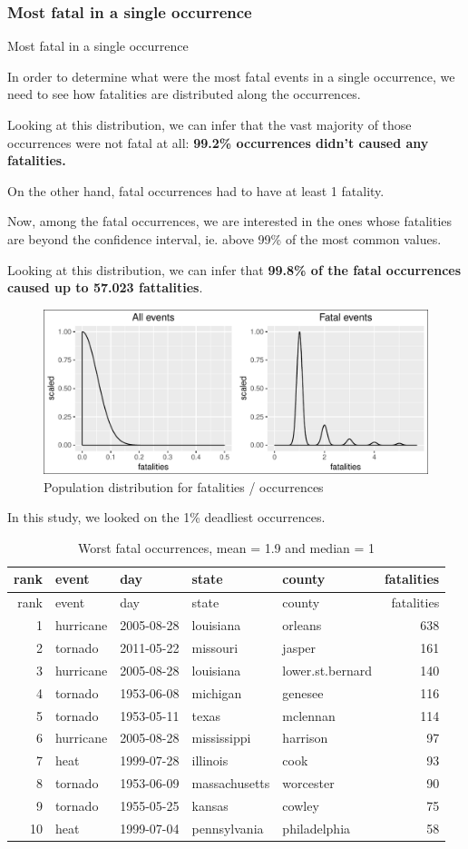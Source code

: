 \documentclass[]{article}
\begin{document}
\subsubsection{Most fatal in a single
occurrence}\label{most-fatal-in-a-single-occurrence}

Most fatal in a single occurrence

In order to determine what were the most fatal events in a single
occurrence, we need to see how fatalities are distributed along the
occurrences.

Looking at this distribution, we can infer that the vast majority of
those occurrences were not fatal at all: \textbf{99.2\% occurrences
didn't caused any fatalities.}

On the other hand, fatal occurrences had to have at least 1 fatality.

Now, among the fatal occurrences, we are interested in the ones whose
fatalities are beyond the confidence interval, ie. above 99\% of the
most common values.

Looking at this distribution, we can infer that \textbf{99.8\% of the
fatal occurrences caused up to 57.023 fattalities}.

\begin{figure}[htbp]
\centering
\includegraphics{readme_files/figure-latex/fatal-distr-4-1.pdf}
\caption{Population distribution for fatalities / occurrences}
\end{figure}

In this study, we looked on the 1\% deadliest occurrences.

\begin{longtable}[]{@{}rllllr@{}}
\caption{Worst fatal occurrences, mean = 1.9 and median =
1}\tabularnewline
\toprule
rank & event & day & state & county & fatalities\tabularnewline
\midrule
\endfirsthead
\toprule
rank & event & day & state & county & fatalities\tabularnewline
\midrule
\endhead
1 & hurricane & 2005-08-28 & louisiana & orleans & 638\tabularnewline
2 & tornado & 2011-05-22 & missouri & jasper & 161\tabularnewline
3 & hurricane & 2005-08-28 & louisiana & lower.st.bernard &
140\tabularnewline
4 & tornado & 1953-06-08 & michigan & genesee & 116\tabularnewline
5 & tornado & 1953-05-11 & texas & mclennan & 114\tabularnewline
6 & hurricane & 2005-08-28 & mississippi & harrison & 97\tabularnewline
7 & heat & 1999-07-28 & illinois & cook & 93\tabularnewline
8 & tornado & 1953-06-09 & massachusetts & worcester & 90\tabularnewline
9 & tornado & 1955-05-25 & kansas & cowley & 75\tabularnewline
10 & heat & 1999-07-04 & pennsylvania & philadelphia & 58\tabularnewline
\bottomrule
\end{longtable}
\end{document}
